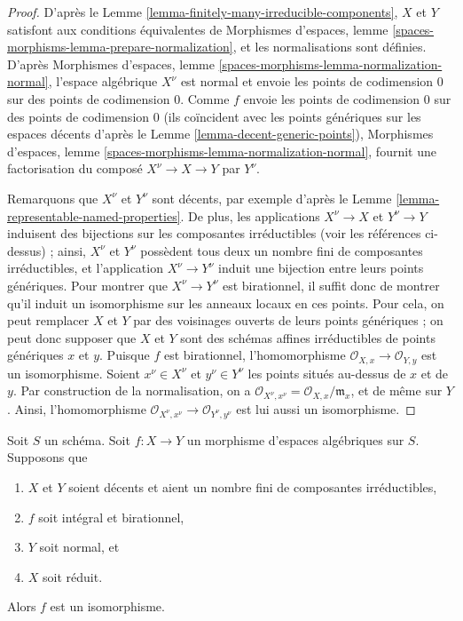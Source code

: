 \begin{proof}
D'après le Lemme \ref{lemma-finitely-many-irreducible-components},
$X$ et $Y$ satisfont aux conditions équivalentes de Morphismes d'espaces,
lemme \ref{spaces-morphisms-lemma-prepare-normalization}, et les
normalisations sont définies. D'après Morphismes d'espaces, lemme
\ref{spaces-morphisms-lemma-normalization-normal}, l'espace algébrique
$X^\nu$ est normal et envoie les points de codimension $0$ sur des points de
codimension $0$. Comme $f$ envoie les points de codimension $0$ sur des
points de codimension $0$ (ils coïncident avec les points génériques sur les
espaces décents d'après le Lemme \ref{lemma-decent-generic-points}),
Morphismes d'espaces, lemme
\ref{spaces-morphisms-lemma-normalization-normal}, fournit une factorisation
du composé $X^\nu \to X \to Y$ par $Y^\nu$.

\medskip\noindent
Remarquons que $X^\nu$ et $Y^\nu$ sont décents, par exemple d'après le
Lemme \ref{lemma-representable-named-properties}.
De plus, les applications $X^\nu \to X$ et $Y^\nu \to Y$ induisent des
bijections sur les composantes irréductibles (voir les références ci-dessus) ;
ainsi, $X^\nu$ et $Y^\nu$ possèdent tous deux un nombre fini de composantes
irréductibles, et l'application $X^\nu \to Y^\nu$ induit une bijection entre
leurs points génériques. Pour montrer que $X^\nu \to Y^\nu$ est birationnel,
il suffit donc de montrer qu'il induit un isomorphisme sur les anneaux locaux
en ces points. Pour cela, on peut remplacer $X$ et $Y$ par des voisinages
ouverts de leurs points génériques ; on peut donc supposer que $X$ et $Y$
sont des schémas affines irréductibles de points génériques $x$ et $y$.
Puisque $f$ est birationnel, l'homomorphisme
$\mathcal{O}_{X, x} \to \mathcal{O}_{Y, y}$ est un isomorphisme.
Soient $x^\nu \in X^\nu$ et $y^\nu \in Y^\nu$ les points situés au-dessus
de $x$ et de $y$. Par construction de la normalisation, on a
$\mathcal{O}_{X^\nu, x^\nu} = \mathcal{O}_{X, x}/\mathfrak m_x$,
et de même sur $Y$. Ainsi, l'homomorphisme
$\mathcal{O}_{X^\nu, x^\nu} \to \mathcal{O}_{Y^\nu, y^\nu}$
est lui aussi un isomorphisme.
\end{proof}

\begin{lemma}
\label{lemma-finite-birational-over-normal}
Soit $S$ un schéma. Soit $f : X \to Y$ un morphisme d'espaces algébriques
sur $S$. Supposons que
\begin{enumerate}
\item $X$ et $Y$ soient décents et aient un nombre fini de composantes
irréductibles,
\item $f$ soit intégral et birationnel,
\item $Y$ soit normal, et
\item $X$ soit réduit.
\end{enumerate}
Alors $f$ est un isomorphisme.
\end{lemma}

